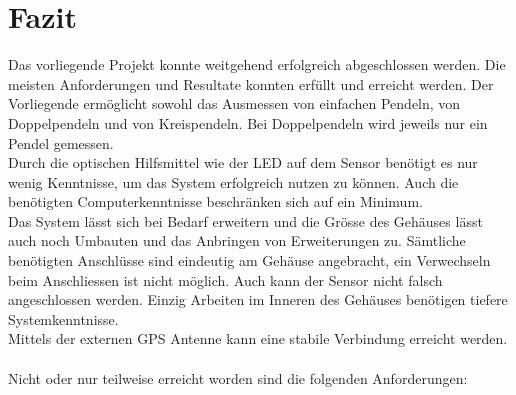 \section{Fazit}
Das vorliegende Projekt \documenttitle konnte weitgehend erfolgreich abgeschlossen werden. Die meisten Anforderungen und Resultate konnten erfüllt und erreicht werden. 
Der Vorliegende \documenttitle ermöglicht sowohl das Ausmessen von einfachen Pendeln, von Doppelpendeln und von Kreispendeln. Bei Doppelpendeln wird jeweils nur ein Pendel gemessen.\\
Durch die optischen Hilfsmittel wie der LED auf dem Sensor benötigt es nur wenig Kenntnisse, um das System erfolgreich nutzen zu können. Auch die benötigten Computerkenntnisse beschränken sich auf ein Minimum.\\
Das System lässt sich bei Bedarf erweitern und die Grösse des Gehäuses lässt auch noch Umbauten und das Anbringen von Erweiterungen zu. Sämtliche benötigten Anschlüsse sind eindeutig am Gehäuse angebracht, ein Verwechseln beim Anschliessen ist nicht möglich. Auch kann der Sensor nicht falsch angeschlossen werden. Einzig Arbeiten im Inneren des Gehäuses benötigen tiefere Systemkenntnisse.\\
Mittels der externen GPS Antenne kann eine stabile Verbindung erreicht werden.\\
\\
Nicht oder nur teilweise erreicht worden sind die folgenden Anforderungen:
